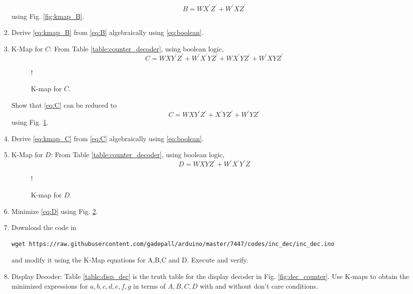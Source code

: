 \documentclass[journal,12pt,twocolumn]{IEEEtran}
\begin{document}
\begin{enumerate}[1.]
\begin{equation}
\label{eq:kmap_B}
B = WX^{\prime}Z^{\prime} + W^{\prime}XZ^{\prime}
\end{equation}
using Fig. \ref{fig:kmap_B}.
\item Derive \eqref{eq:kmap_B} from \eqref{eq:B} algebraically using \eqref{eq:boolean}.
%
%
\item {K-Map for $C$: }
From Table \ref{table:counter_decoder}, using boolean logic,
\begin{equation}
\label{eq:C}
C = WXY^{\prime}Z^{\prime} + W^{\prime}X^{\prime}YZ^{\prime}
+WX^{\prime}YZ^{\prime}
+W^{\prime}XYZ^{\prime}
\end{equation}
%
%
\begin{figure}[!h]
\resizebox {\columnwidth} {!} {

}
\caption{K-map for $C$.}
\label{fig:kmap_C}
\end{figure}
%
Show that \eqref{eq:C} can be reduced to
\begin{equation}
\label{eq:kmap_C}
C = WXY^{\prime}Z^{\prime}  +  X^{\prime}YZ^{\prime} + W^{\prime}YZ^{\prime}
\end{equation}
using Fig. \ref{fig:kmap_C}.
%
\item 
Derive \eqref{eq:kmap_C} from \eqref{eq:C} algebraically using \eqref{eq:boolean}.
%
\item {K-Map for $D$: }
From Table \ref{table:counter_decoder}, using boolean logic,
\begin{equation}
\label{eq:D}
D = WXYZ^{\prime} + W^{\prime}X^{\prime}Y^{\prime}Z
\end{equation}
%
\begin{figure}[!h]
\resizebox {\columnwidth} {!} {

}
\caption{K-map for $D$.}
\label{fig:kmap_D}
\end{figure}
%
\item 
Minimize \eqref{eq:D} using Fig. \ref{fig:kmap_D}.
%
\item Download the code in
\begin{lstlisting}
wget https://raw.githubusercontent.com/gadepall/arduino/master/7447/codes/inc_dec/inc_dec.ino
\end{lstlisting}
%
and modify it using the K-Map equations for A,B,C and D. Execute and verify.
\item {Display Decoder:}
Table \ref{table:disp_dec} is the truth table for the display decoder in Fig. \ref{fig:dec_counter}.  
Use K-maps to obtain the minimized expressions for $a,b,c,d,e,f,g$ in terms of $A,B,C,D$ with and without don't care conditions.
%

\end{enumerate}
\end{document}
